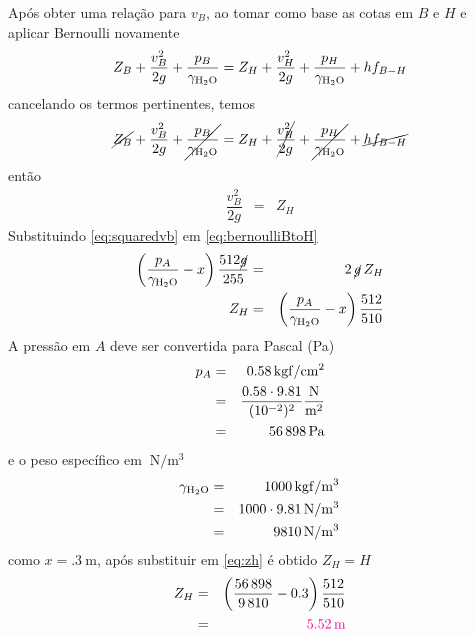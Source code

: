 \documentclass[a4paper, 12pt, brazilian]{article}
\newcommand{\purple}[1]{\textcolor{magenta}{#1}}
\begin{document}
	Após obter uma relação para $v_{B}$, ao tomar como base as cotas em $B$ e $H$ e aplicar Bernoulli novamente
	\begin{equation}
			Z_{B}+\dfrac{v_{B}^{2}}{2g}+\dfrac{p_{B}}{\gamma_{\ce{H2O}}}=Z_{H}+\dfrac{v_{H}^{2}}{2g}+\dfrac{p_{H}}{\gamma_{\ce{H2O}}}+hf_{B-H}
	\end{equation}
	cancelando os termos pertinentes, temos
	\begin{equation}
		\cancel{Z_{B}}+\dfrac{v_{B}^{2}}{2g}+\cancel{\dfrac{p_{B}}{\gamma_{\ce{H2O}}}}=Z_{H}+\cancel{\dfrac{v_{H}^{2}}{2g}}+\cancel{\dfrac{p_{H}}{\gamma_{\ce{H2O}}}}+\cancel{hf_{B-H}}
	\end{equation}
	então
	\begin{eqnarray}
		\label{eq:bernoulliBtoH}
		\dfrac{v_{B}^{2}}{2g}&=&Z_{H}
	\end{eqnarray}
	Substituindo \eqref{eq:squaredvb} em \eqref{eq:bernoulliBtoH}
	\begin{eqnarray}
		\left(\dfrac{p_{A}}{\gamma_{\ce{H2O}}}-x\right)\dfrac{512\cancel{g}}{255}&=&2\,\cancel{g}\,Z_{H}\\
		Z_{H}&=&\left(\dfrac{p_{A}}{\gamma_{\ce{H2O}}}-x\right)\dfrac{512}{510}\label{eq:zh}
	\end{eqnarray}
	A pressão em $A$ deve ser convertida para Pascal (Pa)
	\begin{eqnarray}
		p_{A}&=&\SI{.58}{\kilogram f/\centi\meter^{2}}\\
			 &=&\dfrac{0.58\cdot 9.81}{(10^{-2})^{2}}\SI{}{\dfrac{\newton}{\meter^{2}}}\\
			 &=&\SI{56898}{\pascal}
	\end{eqnarray}
	e o peso específico em $\SI{}{\newton/\meter^{3}}$
	\begin{eqnarray}
		\gamma_{\ce{H2O}}&=&\SI{1000}{\kilogram f/\meter^{3}}\\
						 &=&1000\cdot 9.81\,\SI{}{\newton/\meter^{3}}\\
						 &=&\SI{9810}{\newton/\meter^{3}}
	\end{eqnarray}
	como $x=\SI{.3}{\meter}$, após substituir em \eqref{eq:zh} é obtido $Z_{H}=H$
	\begin{eqnarray}
		Z_{H}&=&\left(\dfrac{56\,898}{9\,810}-0.3\right)\dfrac{512}{510}\\
			 &=&\purple{\SI{5.52}{\meter}}
	\end{eqnarray}
\end{document}
